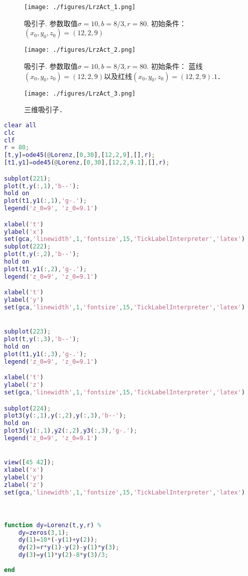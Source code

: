 \begin{figure}[ht]
\centering
\texttt{[image: ./figures/LrzAct\_1.png]}
\caption{吸引子. 参数取值$\sigma=10,b=8/3, r=80$. 初始条件： $(x_0,y_0,z_0)=(12,2,9)$} \label{LrzAct_fig1}
\end{figure}

\begin{figure}[ht]
\centering
\texttt{[image: ./figures/LrzAct\_2.png]}
\caption{吸引子. 参数取值$\sigma=10,b=8/3, r=80$. 初始条件： 蓝线$(x_0,y_0,z_0)=(12,2,9)$以及红线$(x_0,y_0,z_0)=(12,2,9).1$．} \label{LrzAct_fig2}
\end{figure}

\begin{figure}[ht]
\centering
\texttt{[image: ./figures/LrzAct\_3.png]}
\caption{三维吸引子．} \label{LrzAct_fig3}
\end{figure}

\begin{lstlisting}[language=matlab]
clear all
clc
clf
r = 80;
[t,y]=ode45(@Lorenz,[0,30],[12,2,9],[],r);
[t1,y1]=ode45(@Lorenz,[0,30],[12,2,9.1],[],r);

subplot(221);
plot(t,y(:,1),'b--');
hold on
plot(t1,y1(:,1),'g-.');
legend('z_0=9', 'z_0=9.1')

xlabel('t')
ylabel('x')
set(gca,'linewidth',1,'fontsize',15,'TickLabelInterpreter','latex')
subplot(222);
plot(t,y(:,2),'b--');
hold on
plot(t1,y1(:,2),'g-.');
legend('z_0=9', 'z_0=9.1')

xlabel('t')
ylabel('y')
set(gca,'linewidth',1,'fontsize',15,'TickLabelInterpreter','latex')


subplot(223);
plot(t,y(:,3),'b--');
hold on
plot(t1,y1(:,3),'g-.');
legend('z_0=9', 'z_0=9.1')

xlabel('t')
ylabel('z')
set(gca,'linewidth',1,'fontsize',15,'TickLabelInterpreter','latex')

subplot(224);
plot3(y(:,1),y(:,2),y(:,3),'b--');
hold on
plot3(y1(:,1),y2(:,2),y3(:,3),'g-.');
legend('z_0=9', 'z_0=9.1')


view([45 42]);
xlabel('x')
ylabel('y')
zlabel('z')
set(gca,'linewidth',1,'fontsize',15,'TickLabelInterpreter','latex')



function dy=Lorenz(t,y,r) %
    dy=zeros(3,1);
    dy(1)=10*(-y(1)+y(2));
    dy(2)=r*y(1)-y(2)-y(1)*y(3);
    dy(3)=y(1)*y(2)-8*y(3)/3;
    
end

\end{lstlisting}


